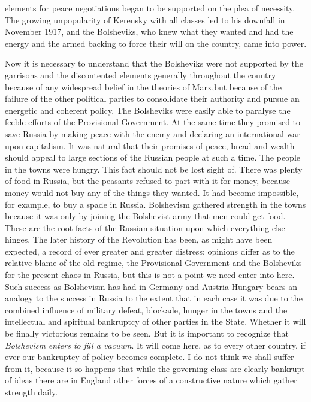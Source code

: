 \documentclass{book}
\begin{document}
elements for peace negotiations began to be supported on the plea of necessity. The growing unpopularity of Kerensky with all classes led to his downfall in November 1917, and the Bolsheviks, who knew what they wanted and had the energy and the armed backing to force their will on the country, came into power.

Now it is necessary to understand that the Bolsheviks were not supported by the garrisons and the discontented elements generally throughout the country because of any widespread belief in the theories of Marx,\footnotemark[1] but because of the failure of the other political parties to consolidate their authority and pursue an energetic and coherent policy. The Bolsheviks were easily able to paralyse the feeble efforts of the Provisional Government. At the same time they promised to save Russia by making peace with the enemy and declaring an international war upon capitalism. It was natural that their promises of peace, bread and wealth should appeal to large sections of the Russian people at such a time. The people in the towns were hungry. This fact should not be lost sight of. There was plenty of food in Russia, but the peasants refused to part with it for money, because money would not buy any of the things they wanted. It had become impossible, for example, to buy a spade in Russia. Bolshevism gathered strength in the towns because it was only by joining the Bolshevist army that men could get food. These are the root facts of the Russian situation upon which everything else hinges. The later history of the Revolution has been, as might have been expected, a record of ever greater and greater distress; opinions differ as to the relative blame of the old regime, the Provisional Government and the Bolsheviks for the present chaos in Russia, but this is not a point we need enter into here. Such success as Bolshevism has had in Germany and Austria-Hungary bears an analogy to the success in Russia to the extent that in each case it was due to the combined influence of military defeat, blockade, hunger in the towns and the intellectual and spiritual bankruptcy of other parties in the State. Whether it will be finally victorious remains to be seen. But it is important to recognize that \emph{Bolshevism enters to fill a vacuum}. It will come here, as to every other country, if ever our bankruptcy of policy becomes complete. I do not think we shall suffer from it, because it so happens that while the governing class are clearly bankrupt of ideas there are in England other forces of a constructive nature which gather strength daily.
\end{document}
